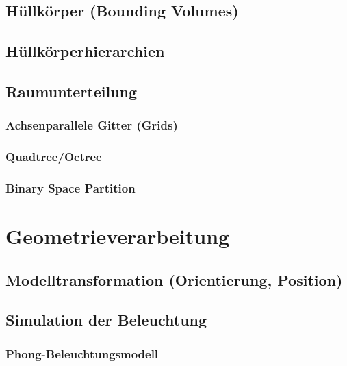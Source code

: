 \documentclass[a4paper, 11pt, accentcolor = tud3b]{tudreport}
\begin{document}
			\subsection{Hüllkörper (Bounding Volumes)} %

			\subsection{Hüllkörperhierarchien} %

			\subsection{Raumunterteilung} %

				\subsubsection{Achsenparallele Gitter (Grids)} %

				\subsubsection{Quadtree/Octree} %

				\subsubsection{Binary Space Partition} %

		\section{Geometrieverarbeitung} %

			\subsection{Modelltransformation (Orientierung, Position)} %

			\subsection{Simulation der Beleuchtung} %

				\subsubsection{Phong-Beleuchtungsmodell} %
\end{document}
